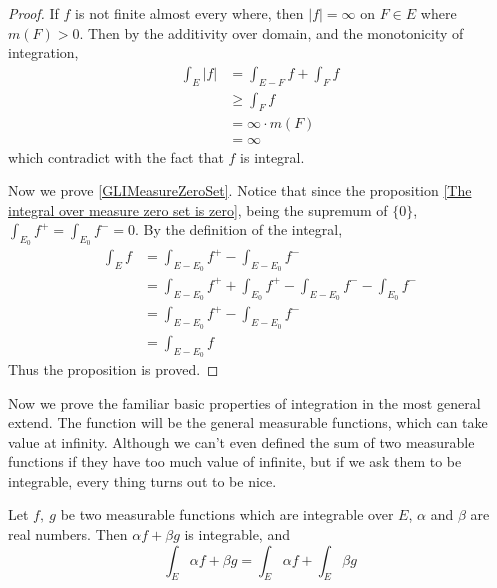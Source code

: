 \documentclass[lang=en, 12pt]{elegantbook}
\begin{document}
        \begin{proof}
            If $f$ is not finite almost every where, then $|f| = \infty$ on $F \in E$ where $m(F) > 0$. 
        Then by the additivity over domain, and the monotonicity of integration,
        \begin{equation*}
            \begin{aligned}
                \int_E |f| &= \int_{E- F} f + \int_{F} f\\
                &\geq \int_{F} f\\
                &= \infty \cdot m(F)\\
                &= \infty
            \end{aligned}
        \end{equation*}
        which contradict with the fact that $f$ is integral.\par
        Now we prove \eqref{GLIMeasureZeroSet}. Notice that since the proposition \ref{The integral over measure zero set is zero}, being 
        the supremum of $\{0\}$, $\int_{E_0} f^+ = \int_{E_0} f^- = 0$.
        By the definition of the integral,
        \begin{equation*}
            \begin{aligned}
                \int_{E} f &= \int_{E-E_0} f^+ - \int_{E-E_0} f^-\\
                &= \int_{E-E_0} f^+ + \int_{E_0} f^+ - \int_{E-E_0} f^- - \int_{E_0} f^-\\
                &= \int_{E-E_0} f^+ - \int_{E-E_0} f^-\\ 
                &= \int_{E-E_0} f
            \end{aligned}
        \end{equation*}
        Thus the proposition is proved.
        \end{proof}
        Now we prove the familiar basic properties of integration in the most general extend. The function will be the general measurable functions, 
    which can take value at infinity. Although we can't even defined the sum of two measurable functions if they have too much value of 
    infinite, but if we ask them to be integrable, every thing turns out to be nice.
        \begin{theorem}[Linearity]
            Let $f , \ g$ be two measurable functions which are integrable over $E$, $\alpha$ and $\beta$ are real numbers. Then 
        $\alpha f+\beta g$ is integrable, and 
            $$\int_E \alpha f+\beta g = \int_E \alpha f + \int_E \beta g $$
        \end{theorem}
\end{document}
